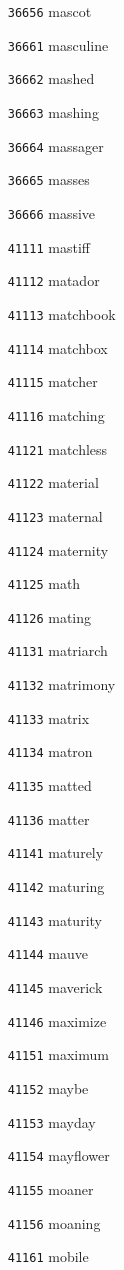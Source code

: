 \documentclass[twoside,11pt]{article}
\begin{document}
\begin{multicols}{5}
\begin{enumerate}
\item[\texttt{36656}] mascot
\item[\texttt{36661}] masculine
\item[\texttt{36662}] mashed
\item[\texttt{36663}] mashing
\item[\texttt{36664}] massager
\item[\texttt{36665}] masses
\item[\texttt{36666}] massive
\item[\texttt{41111}] mastiff
\item[\texttt{41112}] matador
\item[\texttt{41113}] matchbook
\item[\texttt{41114}] matchbox
\item[\texttt{41115}] matcher
\item[\texttt{41116}] matching
\item[\texttt{41121}] matchless
\item[\texttt{41122}] material
\item[\texttt{41123}] maternal
\item[\texttt{41124}] maternity
\item[\texttt{41125}] math
\item[\texttt{41126}] mating
\item[\texttt{41131}] matriarch
\item[\texttt{41132}] matrimony
\item[\texttt{41133}] matrix
\item[\texttt{41134}] matron
\item[\texttt{41135}] matted
\item[\texttt{41136}] matter
\item[\texttt{41141}] maturely
\item[\texttt{41142}] maturing
\item[\texttt{41143}] maturity
\item[\texttt{41144}] mauve
\item[\texttt{41145}] maverick
\item[\texttt{41146}] maximize
\item[\texttt{41151}] maximum
\item[\texttt{41152}] maybe
\item[\texttt{41153}] mayday
\item[\texttt{41154}] mayflower
\item[\texttt{41155}] moaner
\item[\texttt{41156}] moaning
\item[\texttt{41161}] mobile

\end{enumerate}
\end{multicols}
\end{document}
